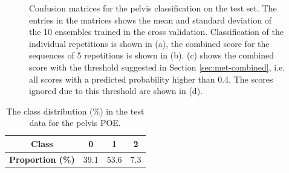 \begin{figure}[h]
\begin{subfigure}[t]{0.48\textwidth}
      \caption{}
      \label{fig:pelvis-cnf-ignored}
  \end{subfigure}
  \caption{Confusion matrices for the pelvis classification on the test set. The entries in the matrices shows the mean and standard deviation of the 10 ensembles trained in the cross validation. Classification of the individual repetitions is shown in (a), the combined score for the sequences of 5 repetitions is shown in (b). (c) shows the combined score with the threshold suggested in Section \ref{sec:met-combined}, i.e. all scores with a predicted probability higher than 0.4. The scores ignored due to this threshold are shown in (d).}
  \label{fig:pelvis-cnfs}
\end{figure}

\begin{table}[h]
  \caption{The class distribution (\%) in the test data for the pelvis POE.}
  \label{tab:pelvis-class-dist}
  \centering
  \begin{tabu}[c]{cccc}
    \textbf{Class}            & 0 & 1 & 2 \\ \hline \hline
    \textbf{Proportion (\%)}  & 39.1 & 53.6 & 7.3
  \end{tabu}
\end{table}

